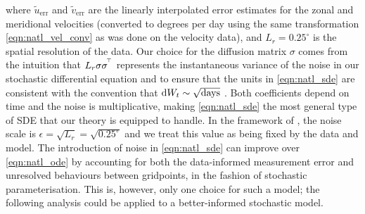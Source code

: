 where \(\tilde{u}_{\mathrm{err}}\) and \(\tilde{v}_{\mathrm{err}}\) are the linearly interpolated error estimates for the zonal and meridional velocities (converted to degrees per day using the same transformation \cref{eqn:natl_vel_conv} as was done on the velocity data), and \(L_r = 0.25^\circ\) is the spatial resolution of the data.
Our choice for the diffusion matrix \(\sigma\) comes from the intuition that \(L_r\sigma\sigma^{^{\!\top}}\) represents the instantaneous variance of the noise in our stochastic differential equation and to ensure that the units in \cref{eqn:natl_sde} are consistent with the convention that \(\dif W_t \sim \sqrt{\mathrm{days}}\) \citep{Oksendal_2003_StochasticDifferentialEquations}.
Both coefficients depend on time and the noise is multiplicative, making \cref{eqn:natl_sde} the most general type of SDE that our theory is equipped to handle.
In the framework of , the noise scale is \(\epsilon = \sqrt{L_r} = \sqrt{0.25^\circ}\) and we treat this value as being fixed by the data and model.
The introduction of noise in \cref{eqn:natl_sde} can improve over \cref{eqn:natl_ode} by accounting for both the data-informed measurement error and unresolved behaviours between gridpoints, in the fashion of stochastic parameterisation.
This is, however, only one choice for such a model; the following analysis could be applied to a better-informed stochastic model.









